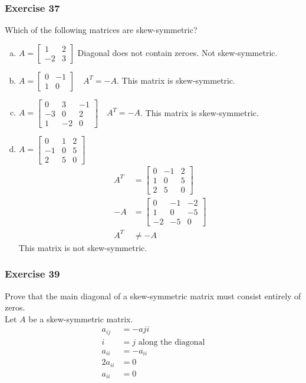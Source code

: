 \documentclass{math}
\begin{document}
\subsubsection*{Exercise 37}
Which of the following matrices are skew-symmetric?
\begin{enumerate}[(a)]
  \item \( A = \begin{bmatrix}1 & 2 \\ -2 & 3\end{bmatrix} \) Diagonal does not
  contain zeroes. Not skew-symmetric.
  \item \( A = \begin{bmatrix}0 & -1 \\ 1 & 0\end{bmatrix} \quad A^T = -A \).
  This matrix is skew-symmetric.
  \item \( A = \begin{bmatrix}0 & 3 & -1 \\ -3 & 0 & 2 \\ 1 & -2 & 0
  \end{bmatrix} \quad A^T = -A \). This matrix is skew-symmetric.
  \item \( A = \begin{bmatrix}0 & 1 & 2 \\ -1 & 0 & 5 \\ 2 & 5 & 0
  \end{bmatrix} \)
  \begin{align*}
    A^T &= \begin{bmatrix}
      0 & -1 & 2 \\
      1 & 0 & 5 \\
      2 & 5 & 0
    \end{bmatrix} \\
    -A &= \begin{bmatrix}
      0 & -1 & -2 \\
      1 & 0 & -5 \\
      -2 & -5 & 0
    \end{bmatrix} \\
    A^T &\ne -A
  \end{align*}
  This matrix is not skew-symmetric.
\end{enumerate}

\subsubsection*{Exercise 39}
Prove that the main diagonal of a skew-symmetric matrix must consist entirely
of zeros. \\
Let \( A \) be a skew-symmetric matrix.
\begin{align*}
  a_{ij} &= -a{ji} \\
  i &= j \text{ along the diagonal} \\
  a_{ii} &= -a_{ii} \\
  2a_{ii} &= 0 \\
  a_{ii} &= 0
\end{align*}
\end{document}
